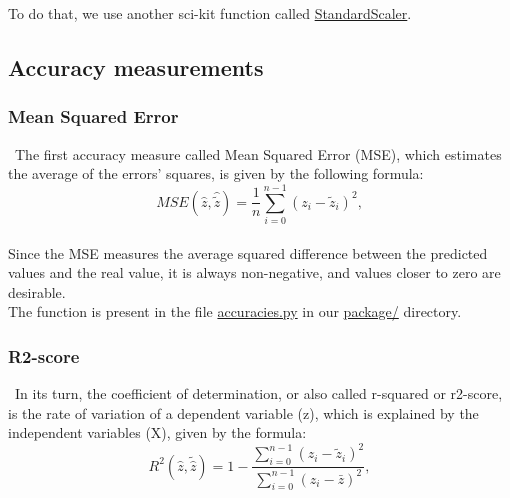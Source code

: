 To do that, we use another sci-kit function called \href{https://scikit-learn.org/stable/modules/generated/sklearn.preprocessing.StandardScaler.html}{StandardScaler}.\\

\subsection{Accuracy measurements}
\label{chap:Accuracy measurements}

\subsubsection{Mean Squared Error}
\label{chap:Mean Squared Error}

\quad \, The first accuracy measure called Mean Squared Error (MSE), which estimates the average of the errors' squares, is given by the following formula:\\

\begin{equation}
\label{MSE-Function}
MSE(\hat{z},\hat{\tilde{z}}) = \frac{1}{n}
\sum_{i=0}^{n-1}(z_i-\tilde{z}_i)^2,
\end{equation}\\

Since the MSE measures the average squared difference between the predicted values and the real value, it is always non-negative, and values closer to zero are desirable.\\

The function is present in the file \href{https://github.com/fabiorodp/UiO-FYS-STK4155/blob/master/Project1/package/accuracies.py}{accuracies.py} in our \href{https://github.com/fabiorodp/UiO-FYS-STK4155/tree/master/Project1/package}{package/} directory.\\

\subsubsection{R2-score}
\label{chap:R2-score}

\quad \, In its turn, the coefficient of determination, or also called r-squared or r2-score, is the rate of variation of a dependent variable (z), which is explained by the independent variables (X), given by the formula:\\

\begin{equation}
\label{R2-Function}
R^2(\hat{z}, \tilde{\hat{z}}) = 1 - \frac{\sum_{i=0}^{n - 1} (z_i - \tilde{z}_i)^2}{\sum_{i=0}^{n - 1} (z_i - \bar{z})^2},
\end{equation}\\

